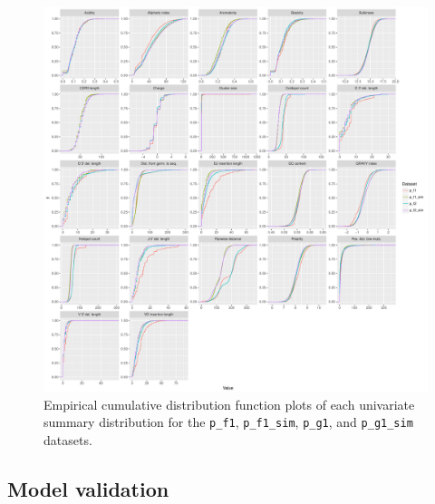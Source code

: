 \documentclass{article}
\begin{document}
\begin{figure}
    \includegraphics[width=\linewidth]{Figures/master_plot_ecdf.pdf}
    \caption{Empirical cumulative distribution function plots of each univariate summary distribution for the \texttt{p\_f1}, \texttt{p\_f1\_sim}, \texttt{p\_g1}, and \texttt{p\_g1\_sim} datasets.}
    \label{fig:MasterPlotECDF}
\end{figure}

\subsection*{Model validation}
\end{document}
